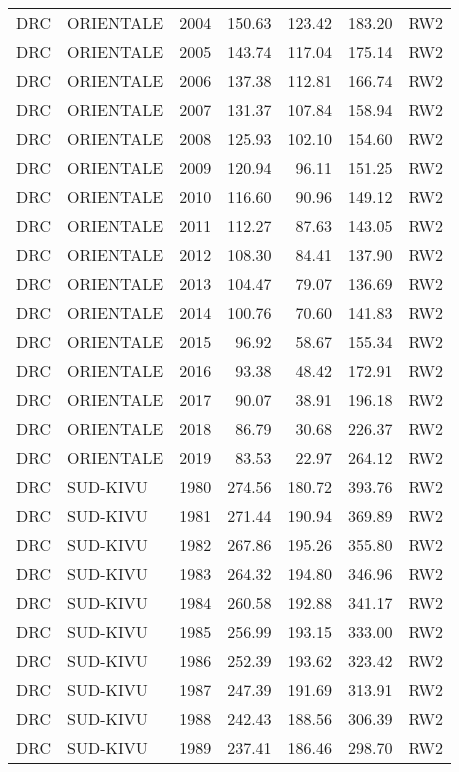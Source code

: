 \begin{longtable}{lllrrrl}
  DRC & ORIENTALE & 2004 & 150.63 & 123.42 & 183.20 & RW2 \\ 
  DRC & ORIENTALE & 2005 & 143.74 & 117.04 & 175.14 & RW2 \\ 
  DRC & ORIENTALE & 2006 & 137.38 & 112.81 & 166.74 & RW2 \\ 
  DRC & ORIENTALE & 2007 & 131.37 & 107.84 & 158.94 & RW2 \\ 
  DRC & ORIENTALE & 2008 & 125.93 & 102.10 & 154.60 & RW2 \\ 
  DRC & ORIENTALE & 2009 & 120.94 & 96.11 & 151.25 & RW2 \\ 
  DRC & ORIENTALE & 2010 & 116.60 & 90.96 & 149.12 & RW2 \\ 
  DRC & ORIENTALE & 2011 & 112.27 & 87.63 & 143.05 & RW2 \\ 
  DRC & ORIENTALE & 2012 & 108.30 & 84.41 & 137.90 & RW2 \\ 
  DRC & ORIENTALE & 2013 & 104.47 & 79.07 & 136.69 & RW2 \\ 
  DRC & ORIENTALE & 2014 & 100.76 & 70.60 & 141.83 & RW2 \\ 
  DRC & ORIENTALE & 2015 & 96.92 & 58.67 & 155.34 & RW2 \\ 
  DRC & ORIENTALE & 2016 & 93.38 & 48.42 & 172.91 & RW2 \\ 
  DRC & ORIENTALE & 2017 & 90.07 & 38.91 & 196.18 & RW2 \\ 
  DRC & ORIENTALE & 2018 & 86.79 & 30.68 & 226.37 & RW2 \\ 
  DRC & ORIENTALE & 2019 & 83.53 & 22.97 & 264.12 & RW2 \\ 
  DRC & SUD-KIVU & 1980 & 274.56 & 180.72 & 393.76 & RW2 \\ 
  DRC & SUD-KIVU & 1981 & 271.44 & 190.94 & 369.89 & RW2 \\ 
  DRC & SUD-KIVU & 1982 & 267.86 & 195.26 & 355.80 & RW2 \\ 
  DRC & SUD-KIVU & 1983 & 264.32 & 194.80 & 346.96 & RW2 \\ 
  DRC & SUD-KIVU & 1984 & 260.58 & 192.88 & 341.17 & RW2 \\ 
  DRC & SUD-KIVU & 1985 & 256.99 & 193.15 & 333.00 & RW2 \\ 
  DRC & SUD-KIVU & 1986 & 252.39 & 193.62 & 323.42 & RW2 \\ 
  DRC & SUD-KIVU & 1987 & 247.39 & 191.69 & 313.91 & RW2 \\ 
  DRC & SUD-KIVU & 1988 & 242.43 & 188.56 & 306.39 & RW2 \\ 
  DRC & SUD-KIVU & 1989 & 237.41 & 186.46 & 298.70 & RW2 \\ 

\end{longtable}
